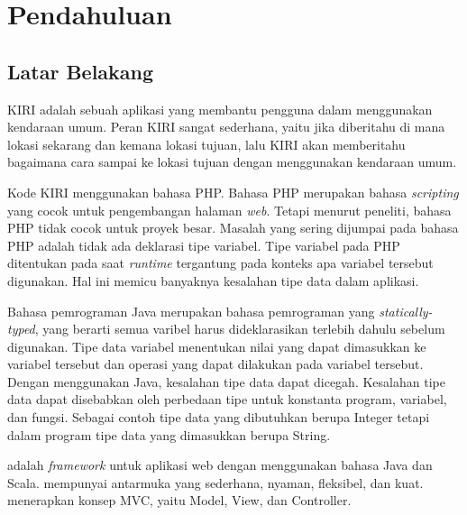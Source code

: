 \chapter{Pendahuluan}
\label{chap:pendahuluan}

\section{Latar Belakang}
\label{sec:latarbelakang}

KIRI \cite{statickiri} adalah sebuah aplikasi yang membantu pengguna dalam menggunakan kendaraan umum. Peran KIRI sangat sederhana, yaitu jika diberitahu di mana lokasi sekarang dan kemana lokasi tujuan, lalu KIRI akan memberitahu bagaimana cara sampai ke lokasi tujuan dengan menggunakan kendaraan umum. 

Kode KIRI \cite{githubkiri} menggunakan bahasa PHP. Bahasa PHP \cite{phpnet} merupakan bahasa \textit{scripting} yang cocok untuk pengembangan halaman \textit{web}. Tetapi menurut peneliti, bahasa PHP tidak cocok untuk proyek besar. Masalah yang sering dijumpai pada bahasa PHP adalah tidak ada deklarasi tipe variabel. Tipe variabel pada PHP ditentukan pada saat \textit{runtime} tergantung pada konteks apa variabel tersebut digunakan. Hal ini memicu banyaknya kesalahan tipe data dalam aplikasi.

Bahasa pemrograman Java \cite{java} merupakan bahasa pemrograman yang \textit{statically-typed}, yang berarti semua varibel harus dideklarasikan terlebih dahulu sebelum digunakan. Tipe data variabel menentukan nilai yang dapat dimasukkan ke variabel tersebut dan operasi yang dapat dilakukan pada variabel tersebut. Dengan menggunakan Java, kesalahan tipe data dapat dicegah. Kesalahan tipe data dapat disebabkan oleh perbedaan tipe untuk konstanta program, variabel, dan fungsi. Sebagai contoh tipe data yang dibutuhkan berupa Integer tetapi dalam program tipe data yang dimasukkan berupa String.

\play adalah \textit{framework} untuk aplikasi web dengan menggunakan bahasa Java dan Scala. \play mempunyai antarmuka yang sederhana, nyaman, fleksibel, dan kuat. \play menerapkan konsep MVC, yaitu Model, View, dan Controller\cite{playforjava}. 

